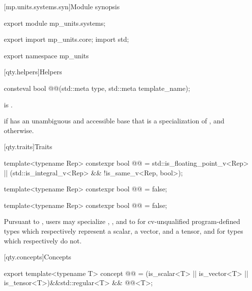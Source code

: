 [mp.units.systems.syn]{Module  synopsis}
%
\begin{codeblock}
export module mp_units.systems;

export import mp_units.core;
import std;

export namespace mp_units {

}
\end{codeblock}

[qty.helpers]{Helpers}

\begin{itemdecl}
consteval bool @@(std::meta type, std::meta template_name);
\end{itemdecl}

\begin{itemdescr}
\pnum
\expects
{} is .

\pnum
\returns
{} if
\tcode{[:type:]} has an unambiguous and accessible base
that is a specialization of , and
 otherwise.
\end{itemdescr}

[qty.traits]{Traits}

\begin{itemdecl}
template<typename Rep>
constexpr bool @@ =
  std::is_floating_point_v<Rep> || (std::is_integral_v<Rep> && !is_same_v<Rep, bool>);

template<typename Rep>
constexpr bool @@ = false;

template<typename Rep>
constexpr bool @@ = false;
\end{itemdecl}

\begin{itemdescr}
\pnum
\remarks
Pursuant to ,
users may specialize , , and  to 
for cv-unqualified program-defined types
which respectively represent
a scalar,
a vector, and
a tensor,
and  for types which respectively do not.
\end{itemdescr}

[qty.concepts]{Concepts}

\begin{itemdecl}
export template<typename T>
concept @@ =
  (is_scalar<T> || is_vector<T> || is_tensor<T>)&&std::regular<T> && @@<T>;
\end{itemdecl}

